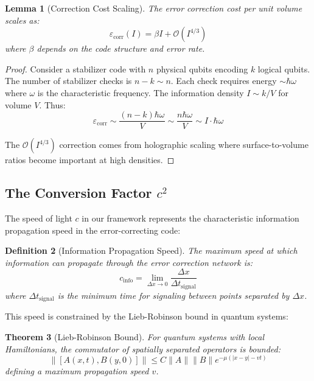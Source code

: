\documentclass[12pt,a4paper]{article}
\newtheorem{theorem}{Theorem}[section]
\newtheorem{lemma}[theorem]{Lemma}
\newtheorem{definition}[theorem]{Definition}
\theoremstyle{remark}
\begin{document}
\begin{lemma}[Correction Cost Scaling]
\label{lem:correction_scaling}
The error correction cost per unit volume scales as:
\begin{equation}
\varepsilon_{\text{corr}}(I) = \beta I + \mathcal{O}(I^{4/3})
\end{equation}
where $\beta$ depends on the code structure and error rate.
\end{lemma}

\begin{proof}
Consider a stabilizer code with $n$ physical qubits encoding $k$ logical qubits. The number of stabilizer checks is $n-k \sim n$. Each check requires energy $\sim \hbar\omega$ where $\omega$ is the characteristic frequency. The information density $I \sim k/V$ for volume $V$. Thus:
\begin{equation}
\varepsilon_{\text{corr}} \sim \frac{(n-k)\hbar\omega}{V} \sim \frac{n\hbar\omega}{V} \sim I \cdot \hbar\omega
\end{equation}

The $\mathcal{O}(I^{4/3})$ correction comes from holographic scaling where surface-to-volume ratios become important at high densities.
\end{proof}

\subsection{The Conversion Factor $c^2$}

The speed of light $c$ in our framework represents the characteristic information propagation speed in the error-correcting code:

\begin{definition}[Information Propagation Speed]
The maximum speed at which information can propagate through the error correction network is:
\begin{equation}
c_{\text{info}} = \lim_{\Delta x \to 0} \frac{\Delta x}{\Delta t_{\text{signal}}}
\end{equation}
where $\Delta t_{\text{signal}}$ is the minimum time for signaling between points separated by $\Delta x$.
\end{definition}

This speed is constrained by the Lieb-Robinson bound in quantum systems:

\begin{theorem}[Lieb-Robinson Bound]
For quantum systems with local Hamiltonians, the commutator of spatially separated operators is bounded:
\begin{equation}
\|[A(x,t), B(y,0)]\| \leq C\|A\|\|B\| e^{-\mu(|x-y| - vt)}
\end{equation}
defining a maximum propagation speed $v$.
\end{theorem}
\end{document}
